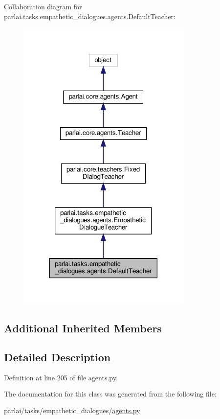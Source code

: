 Collaboration diagram for parlai.\+tasks.\+empathetic\+\_\+dialogues.\+agents.\+Default\+Teacher\+:
\nopagebreak
\begin{figure}[H]
\begin{center}
\leavevmode
\includegraphics[width=245pt]{d4/dcb/classparlai_1_1tasks_1_1empathetic__dialogues_1_1agents_1_1DefaultTeacher__coll__graph}
\end{center}
\end{figure}
\subsection*{Additional Inherited Members}


\subsection{Detailed Description}


Definition at line 205 of file agents.\+py.



The documentation for this class was generated from the following file\+:\begin{DoxyCompactItemize}
\item 
parlai/tasks/empathetic\+\_\+dialogues/\hyperlink{parlai_2tasks_2empathetic__dialogues_2agents_8py}{agents.\+py}\end{DoxyCompactItemize}
